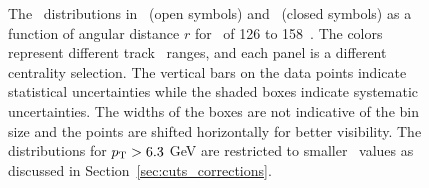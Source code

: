 \begin{figure}[h]
{\begin{tabular}{ccc}
\end{tabular}}
\caption{The \Dptr\ distributions in \pp\ (open symbols) and \pbpb\ (closed symbols) as a function of angular distance $r$ for \ptjet\ of 126 to 158~\GeV.
The colors represent different track \pt\ ranges, and each panel is a different centrality selection.
The vertical bars on the data points indicate statistical uncertainties while the shaded boxes indicate systematic uncertainties.
The widths of the boxes are not indicative of the bin size and the points are shifted horizontally for better visibility.
The distributions for $\mbox{$p_{\mathrm{T}}$} > 6.3$ GeV are restricted to smaller \rvar\ values as discussed in Section~\ref{sec:cuts_corrections}.}
\label{fig:dptr}
\end{figure}



